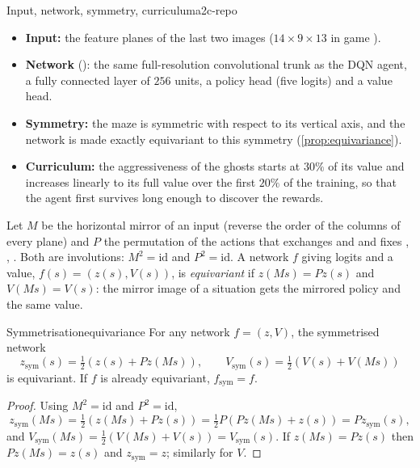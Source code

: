 \begin{pacman}{Input, network, symmetry, curriculum}{a2c-repo}
  \begin{itemize}[nosep]
    \item \textbf{Input:} the feature planes of the last two images
      ($14 \times 9 \times 13$ in game ).
    \item \textbf{Network} (): the same full-resolution
      convolutional trunk as the DQN agent, a fully connected layer of $256$
      units, a policy head (five logits) and a value head.
    \item \textbf{Symmetry:} the maze is symmetric with respect to its
      vertical axis, and the network is made exactly equivariant to this
      symmetry (\cref{prop:equivariance}).
    \item \textbf{Curriculum:} the aggressiveness of the ghosts starts at
      $30\%$ of its value and increases linearly to its full value over the
      first $20\%$ of the training, so that the agent first survives long
      enough to discover the rewards.
  \end{itemize}
\end{pacman}

Let $M$ be the horizontal mirror of an input (reverse the order of the
columns of every plane) and $P$ the permutation of the actions that
exchanges  and  and fixes , , .
Both are involutions: $M^2 = \mathrm{id}$ and $P^2 = \mathrm{id}$. A network
$f$ giving logits and a value, $f(s) = (z(s), V(s))$, is
\emph{equivariant} if $z(Ms) = P z(s)$ and $V(Ms) = V(s)$: the mirror image
of a situation gets the mirrored policy and the same value.

\begin{proposition}{Symmetrisation}{equivariance}
  For any network $f = (z, V)$, the symmetrised network
  \begin{equation}
    z_{\mathrm{sym}}(s) = \tfrac{1}{2} \left( z(s) + P z(Ms) \right), \qquad
    V_{\mathrm{sym}}(s) = \tfrac{1}{2} \left( V(s) + V(Ms) \right)
  \end{equation}
  is equivariant. If $f$ is already equivariant, $f_{\mathrm{sym}} = f$.
\end{proposition}

\begin{proof}
  Using $M^2 = \mathrm{id}$ and $P^2 = \mathrm{id}$,
  \begin{equation*}
    z_{\mathrm{sym}}(Ms) = \tfrac{1}{2} \left( z(Ms) + P z(s) \right)
    = \tfrac{1}{2} P \left( P z(Ms) + z(s) \right) = P z_{\mathrm{sym}}(s),
  \end{equation*}
  and $V_{\mathrm{sym}}(Ms) = \frac{1}{2}(V(Ms) + V(s)) =
  V_{\mathrm{sym}}(s)$. If $z(Ms) = P z(s)$ then $P z(Ms) = z(s)$ and
  $z_{\mathrm{sym}} = z$; similarly for $V$.
\end{proof}


